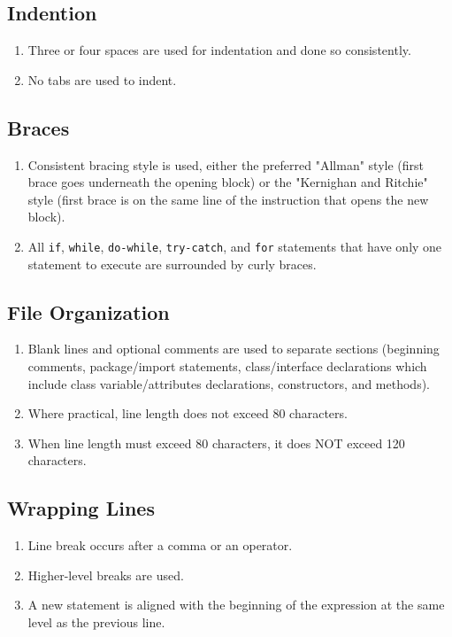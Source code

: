 \documentclass{article}
\begin{document}
\subsection*{Indention}\begin{enumerate}[resume]
\item Three or four spaces are used for indentation and done so consistently.
\item No tabs are used to indent.
\end{enumerate}

\subsection*{Braces}\begin{enumerate}[resume]
\item Consistent bracing style is used, either the preferred "Allman" style (first brace goes underneath the opening block) or the "Kernighan and Ritchie" style (first brace is on the same line of the instruction that opens the new block).
\item All \texttt{if}, \texttt{while}, \texttt{do-while}, \texttt{try-catch}, and \texttt{for} statements that have only one statement to execute are surrounded by curly braces.
\end{enumerate}

\subsection*{File Organization}\begin{enumerate}[resume]
\item Blank lines and optional comments are used to separate sections (beginning comments, package/import statements, class/interface declarations which include class variable/attributes declarations, constructors, and methods).
\item Where practical, line length does not exceed 80 characters.
\item When line length must exceed 80 characters, it does NOT exceed 120 characters.
\end{enumerate}

\subsection*{Wrapping Lines}\begin{enumerate}[resume]
\item Line break occurs after a comma or an operator.
\item Higher-level breaks are used.
\item A new statement is aligned with the beginning of the expression at the same level as the previous line.
\end{enumerate}
\end{document}
